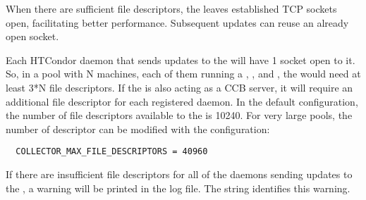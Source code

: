 When there are sufficient file descriptors, the  leaves
established TCP sockets open, facilitating better performance.
Subsequent updates can reuse an already open socket.

Each HTCondor daemon that sends updates to the  will have
1 socket open to it.
So, in a pool with N machines, each of them running a ,
, and , the  would
need at least 3*N file descriptors.  If the  is also
acting as a CCB server, it will require an additional file descriptor for
each registered daemon.
In the default configuration,
the number of file descriptors available to the 
is 10240.
For very large pools,  the number of descriptor can be modified with 
the configuration:

\begin{verbatim}
  COLLECTOR_MAX_FILE_DESCRIPTORS = 40960
\end{verbatim}

If there are insufficient file descriptors for all of the daemons
sending updates to the , 
a warning will be printed in the  log file.  
The string
 identifies this warning.

